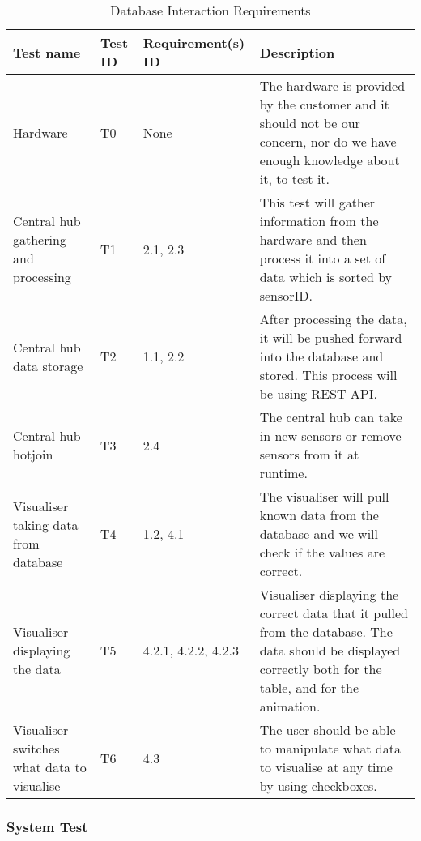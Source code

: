\documentclass[../document]{subfiles}
\begin{document}
\begin{table}[H]
\caption{Database Interaction Requirements}
\centering
\begin{tabularx}{\textwidth}{|X|l|X|X|}
	\hline
	Test name
	&Test ID
	&Requirement(s) ID
	&Description
	\\ \hline Hardware
	&T0
	&None
	&The hardware is provided by the customer and it should not be our concern, nor do we have enough knowledge about it, to test it.
	\\ \hline Central hub gathering and processing
	&T1
	&2.1, 2.3
	&This test will gather information from the hardware and then process it into a set of data which is sorted by sensorID.
	\\ \hline Central hub data storage
	&T2
	&1.1, 2.2
	&After processing the data, it will be pushed forward into the database and stored. This process will be using REST API.
	\\ \hline Central hub hotjoin
	&T3
	&2.4
	&The central hub can take in new sensors or remove sensors from it at runtime.
	\\ \hline Visualiser taking data from database
	&T4
	&1.2, 4.1
	&The visualiser will pull known data from the database and we will check if the values are correct.
	\\ \hline Visualiser displaying the data
	&T5
	&4.2.1, 4.2.2, 4.2.3
	&Visualiser displaying the correct data that it pulled from the database. The data should be displayed correctly both for the table, and for the animation.
	\\ \hline Visualiser switches what data to visualise
	&T6
	&4.3
	&The user should be able to manipulate what data to visualise at any time by using checkboxes.
	\\ \hline 
\end{tabularx}
\end{table}

\subsubsection{System Test}
\end{document}

